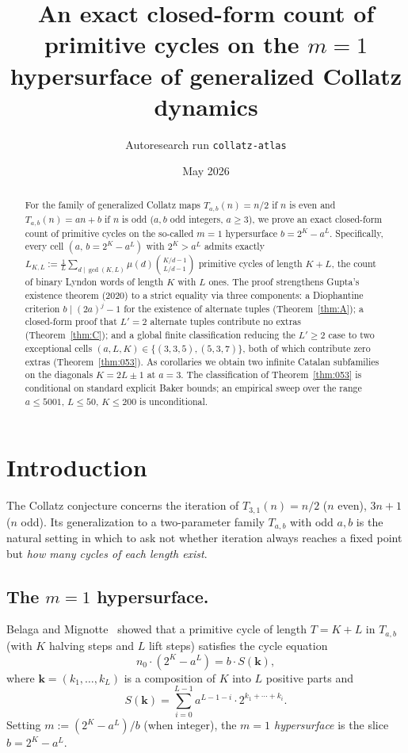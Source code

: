 \documentclass[11pt]{amsart}
\title[Exact cycle counts on the $m{=}1$ hypersurface]{%
An exact closed-form count of primitive cycles on the $m=1$
hypersurface of generalized Collatz dynamics}
\author{Autoresearch run \texttt{collatz-atlas}}
\date{May 2026}
\theoremstyle{plain}
\theoremstyle{definition}
\begin{document}
\begin{abstract}
For the family of generalized Collatz maps
$T_{a,b}(n) = n/2$ if $n$ is even and $T_{a,b}(n) = an+b$ if $n$ is odd
($a, b$ odd integers, $a \geq 3$), we prove an exact closed-form count
of primitive cycles on the so-called $m = 1$ hypersurface
$b = 2^K - a^L$. Specifically, every cell $(a,\, b = 2^K - a^L)$ with
$2^K > a^L$ admits exactly
$L_{K,L} := \tfrac{1}{L}\sum_{d \mid \gcd(K,L)} \mu(d)\binom{K/d-1}{L/d-1}$
primitive cycles of length $K+L$, the count of binary Lyndon words of
length $K$ with $L$ ones. The proof strengthens Gupta's existence
theorem (2020) to a strict equality via three components: a
Diophantine criterion $b \mid (2a)^j - 1$ for the existence of
alternate tuples (Theorem~\ref{thm:A}); a closed-form proof that
$L'=2$ alternate tuples contribute no extras
(Theorem~\ref{thm:C}); and a global finite classification reducing
the $L' \geq 2$ case to two exceptional cells $(a,L,K) \in
\{(3,3,5),(5,3,7)\}$, both of which contribute zero extras
(Theorem~\ref{thm:053}). As corollaries we obtain two infinite
Catalan subfamilies on the diagonals $K = 2L \pm 1$ at $a = 3$.
The classification of Theorem~\ref{thm:053} is conditional on
standard explicit Baker bounds; an empirical sweep over the range
$a \leq 5001$, $L \leq 50$, $K \leq 200$ is unconditional.
\end{abstract}

\maketitle

\section{Introduction}

The Collatz conjecture concerns the iteration of $T_{3,1}(n) = n/2$
($n$ even), $3n+1$ ($n$ odd). Its generalization to a two-parameter
family $T_{a,b}$ with odd $a, b$ is the natural setting in which to
ask not whether iteration always reaches a fixed point but \emph{how
many cycles of each length exist}.

\subsection{The $m = 1$ hypersurface.} Belaga and
Mignotte~\cite{belaga-mignotte} showed that a primitive cycle of
length $T = K + L$ in $T_{a,b}$ (with $K$ halving steps and $L$ lift
steps) satisfies the cycle equation
\begin{equation} \label{eq:cycle}
n_0 \cdot (2^K - a^L) = b \cdot S(\mathbf{k}),
\end{equation}
where $\mathbf{k} = (k_1, \dots, k_L)$ is a composition of $K$ into
$L$ positive parts and
\begin{equation} \label{eq:S}
S(\mathbf{k}) = \sum_{i=0}^{L-1} a^{L-1-i} \cdot 2^{k_1 + \cdots + k_i}.
\end{equation}
Setting $m := (2^K - a^L) / b$ (when integer), the \emph{$m=1$
hypersurface} is the slice $b = 2^K - a^L$.
\end{document}
